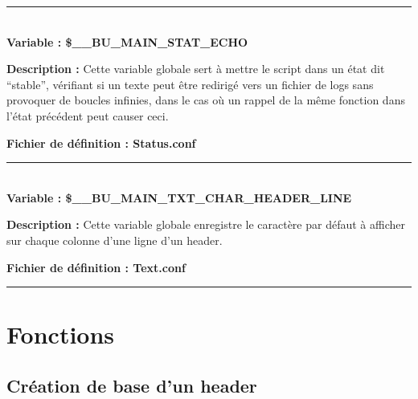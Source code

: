 \documentclass[a4paper,10pt]{article}
\begin{document}
\color{orange}\par\noindent\rule{\textwidth}{0.4pt}\color{white}\\[1\baselineskip]

\textbf{Variable : \color{orange}\$\_\_BU\_MAIN\_STAT\_ECHO}\\[1\baselineskip]

\begin{justify}
    \textbf{Description :} Cette variable globale sert à mettre le script dans un état dit ``stable'', vérifiant si un texte peut être redirigé vers un fichier de logs sans provoquer de boucles infinies, dans le cas où un rappel de la même fonction dans l'état précédent peut causer ceci.
\end{justify}

\textbf{Fichier de définition : \color{lime}Status.conf}\\[1\baselineskip]



\color{orange}\par\noindent\rule{\textwidth}{0.4pt}\color{white}\\[1\baselineskip]

\textbf{Variable : \color{orange}\$\_\_BU\_MAIN\_TXT\_CHAR\_HEADER\_LINE}\\[1\baselineskip]

\begin{justify}
    \textbf{Description :} Cette variable globale enregistre le caractère par défaut à afficher sur chaque colonne d'une ligne d'un header.
\end{justify}

\textbf{Fichier de définition : \color{lime}Text.conf}\\[1\baselineskip]





\color{red}\par\noindent\rule{\textwidth}{0.4pt}\color{white}

\color{red}
\section{Fonctions}\color{white}

\color{green}
\subsection{Création de base d'un header}\color{white}
\end{document}
